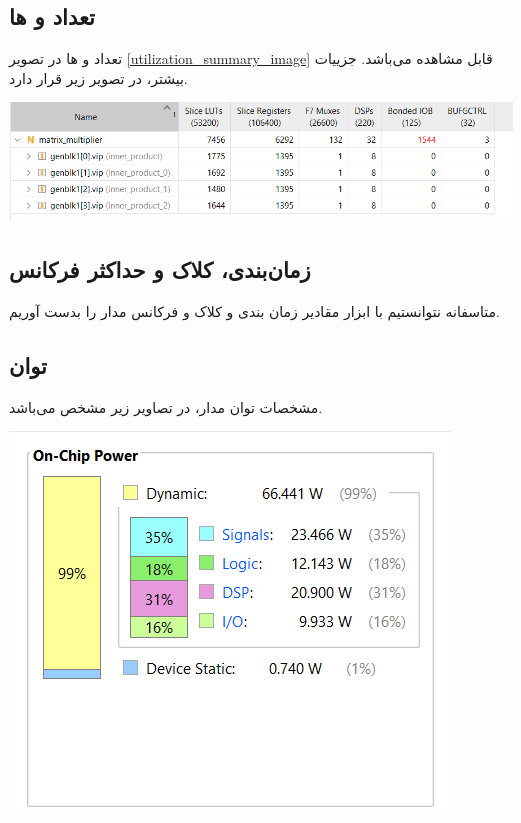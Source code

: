 \documentclass[12pt,titlepage,a4page , tikz , multi,table , svgnames,xcdraw]{article}
\begin{document}
\subsection{تعداد  و ها }
تعداد  و  ها در تصویر 
\ref{utilization_summary_image}
قابل مشاهده می‌باشد. جزییات بیشتر، در تصویر زیر قرار دارد.
\begin{center} 
\includegraphics[scale=0.65]
    {Images/Implementation/util_detailed.png}\\
    \caption{}
\end{center}


\subsection{زمان‌بندی، کلاک و حداکثر فرکانس}
متاسفانه نتوانستیم با ابزار 
مقادیر زمان بندی و کلاک و فرکانس مدار را بدست آوریم.

\subsection{توان}
مشخصات توان مدار، در تصاویر زیر مشخص می‌باشد.
\begin{center} 
\includegraphics[scale=0.65]
    {Images/Implementation/power1.png}\\
    \caption{}
\end{center}
\end{document}
